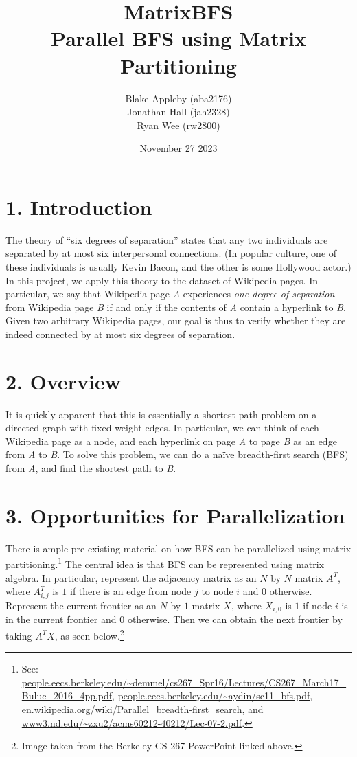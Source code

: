 \documentclass[12pt]{article}
\title{MatrixBFS\\Parallel BFS using Matrix Partitioning}
\author{Blake Appleby (aba2176)\\Jonathan Hall (jah2328)\\Ryan Wee (rw2800)}
\date{November 27 2023}
\begin{document}
\maketitle

\section*{1. Introduction}

The theory of ``six degrees of separation'' states that any two individuals are separated by at most six interpersonal connections. (In popular culture, one of these individuals is usually Kevin Bacon, and the other is some Hollywood actor.) In this project, we apply this theory to the dataset of Wikipedia pages. In particular, we say that Wikipedia page \textit{A} experiences \textit{one degree of separation} from Wikipedia page \textit{B} if and only if the contents of \textit{A} contain a hyperlink to \textit{B}. Given two arbitrary Wikipedia pages, our goal is thus to verify whether they are indeed connected by at most six degrees of separation. 

\section*{2. Overview}

It is quickly apparent that this is essentially a shortest-path problem on a directed graph with fixed-weight edges. In particular, we can think of each Wikipedia page as a node, and each hyperlink on page \textit{A} to page \textit{B} as an edge from \textit{A} to \textit{B}. To solve this problem, we can do a naïve breadth-first search (BFS) from \textit{A}, and find the shortest path to \textit{B}.

\section*{3. Opportunities for Parallelization}

There is ample pre-existing material on how BFS can be parallelized using matrix partitioning.\footnote{See: \url{people.eecs.berkeley.edu/~demmel/cs267_Spr16/Lectures/CS267_March17_Buluc_2016_4pp.pdf}, \url{people.eecs.berkeley.edu/~aydin/sc11_bfs.pdf}, \url{en.wikipedia.org/wiki/Parallel_breadth-first_search}, and \\\url{www3.nd.edu/~zxu2/acms60212-40212/Lec-07-2.pdf}.} The central idea is that BFS can be represented using matrix algebra. In particular, represent the adjacency matrix as an $N$ by $N$ matrix $A^T$, where $A^T_{i,j}$ is $1$ if there is an edge from node $j$ to node $i$ and $0$ otherwise. Represent the current frontier as an $N$ by $1$ matrix $X$, where $X_{i,0}$ is $1$ if node $i$ is in the current frontier and $0$ otherwise. Then we can obtain the next frontier by taking $A^TX$, as seen below.\footnote{Image taken from the Berkeley CS 267 PowerPoint linked above.}
\end{document}
